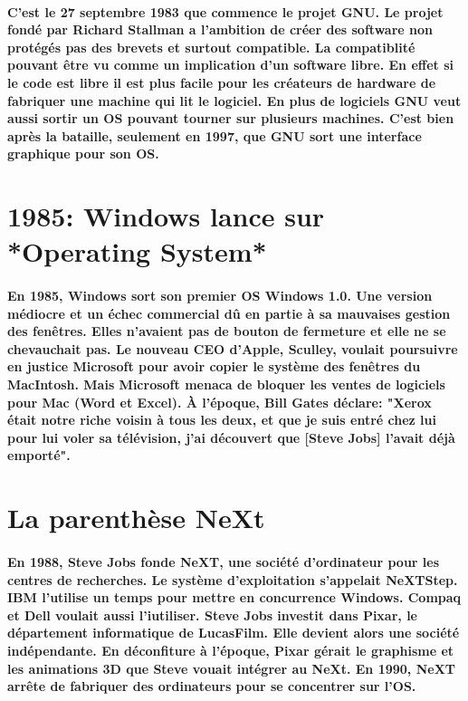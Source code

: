\paragraph{
  C'est le 27 septembre 1983 que commence le projet GNU. Le projet fondé par Richard Stallman a l'ambition de créer des software non protégés pas des brevets et surtout compatible. La compatiblité pouvant être vu comme un implication d'un software libre. En effet si le code est libre il est plus facile pour les créateurs de hardware de fabriquer une machine qui lit le logiciel. En plus de logiciels GNU veut aussi sortir un OS pouvant tourner sur plusieurs machines. C'est bien après la bataille, seulement en 1997, que GNU sort une interface graphique pour son OS.
}

\section*{1985: Windows lance sur *Operating System*}

\paragraph{
  En 1985, Windows sort son premier OS Windows 1.0. Une version médiocre et un échec commercial dû en partie à sa mauvaises gestion des fenêtres. Elles n'avaient pas de bouton de fermeture et elle ne se chevauchait pas. Le nouveau CEO d'Apple, Sculley, voulait poursuivre en justice Microsoft pour avoir copier le système des fenêtres du MacIntosh. Mais Microsoft menaca de bloquer les ventes de logiciels pour Mac (Word et Excel). À l'époque, Bill Gates déclare: "Xerox était notre riche voisin à tous les deux, et que je suis entré chez lui pour lui voler sa télévision, j'ai découvert que [Steve Jobs] l'avait déjà emporté".
}

\section*{La parenthèse NeXt}

\paragraph{
  En 1988, Steve Jobs fonde NeXT, une société d'ordinateur pour les centres de recherches. Le système d'exploitation s'appelait NeXTStep. IBM l'utilise un temps pour mettre en concurrence Windows. Compaq et Dell voulait aussi l'iutiliser. Steve Jobs investit dans Pixar, le département informatique de LucasFilm. Elle devient alors une société indépendante. En déconfiture à l'époque, Pixar gérait le graphisme et les animations 3D que Steve vouait intégrer au NeXt. En 1990, NeXT arrête de fabriquer des ordinateurs pour se concentrer sur l'OS.
}

